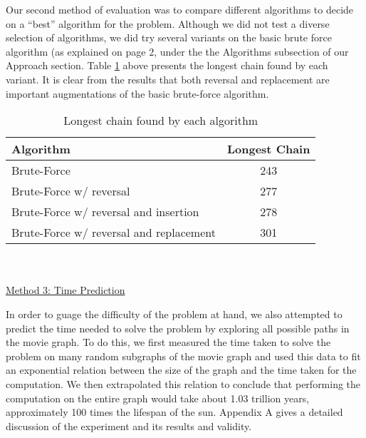 \documentclass[11pt,english]{article}
\begin{document}
Our second method of evaluation was to compare different algorithms to
decide on a ``best'' algorithm for the problem. Although we did not test a
diverse selection of algorithms, we did try several variants on the basic
brute force algorithm (as explained on page 2, under the the Algorithms
subsection of our Approach section. Table \ref{tab:algos} above presents the
longest chain found by each variant. It is clear from the results that both
reversal and replacement are important augmentations of the
basic brute-force algorithm.
\begin{table}
\centering
\begin{tabular}{l|c}
Algorithm                               & Longest Chain \\
\hline
Brute-Force                             & 243           \\
Brute-Force w/ reversal                 & 277           \\
Brute-Force w/ reversal and insertion   & 278           \\
Brute-Force w/ reversal and replacement & 301           \\
\end{tabular}
\caption{Longest chain found by each algorithm}
\vspace{-4mm}
\label{tab:algos}
\end{table}
\\\\
\underline{Method 3: Time Prediction}

In order to guage the difficulty of the problem at hand, we also attempted to
predict the time needed to solve the problem by exploring all possible paths
in the movie graph. To do this, we first measured the time taken to solve the
problem on many random subgraphs of the movie graph and used this data to fit
an exponential relation between the size of the graph and the time taken for
the computation. We then extrapolated this relation to conclude that performing
the computation on the entire graph would take about 1.03 trillion years,
approximately 100 times the lifespan of the sun. Appendix A gives a detailed
discussion of the experiment and its results and validity.
\end{document}
